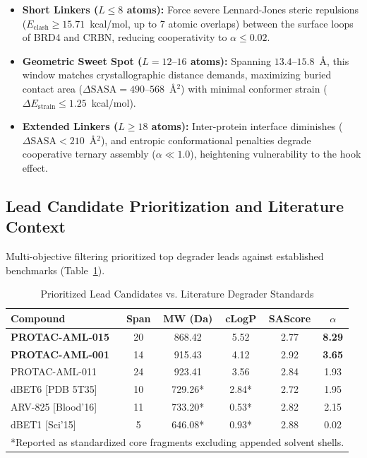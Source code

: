 \documentclass[conference]{IEEEtran}
\begin{document}
\begin{itemize}
    \item \textbf{Short Linkers ($L \le 8$ atoms):} Force severe Lennard-Jones steric repulsions ($E_{\text{clash}} \ge 15.71$~kcal/mol, up to 7 atomic overlaps) between the surface loops of BRD4 and CRBN, reducing cooperativity to $\alpha \le 0.02$.
    \item \textbf{Geometric Sweet Spot ($L = 12\text{--}16$ atoms):} Spanning $13.4\text{--}15.8$~\AA, this window matches crystallographic distance demands, maximizing buried contact area ($\Delta\text{SASA} = 490\text{--}568$~\AA$^2$) with minimal conformer strain ($\Delta E_{\text{strain}} \le 1.25$~kcal/mol).
    \item \textbf{Extended Linkers ($L \ge 18$ atoms):} Inter-protein interface diminishes ($\Delta\text{SASA} < 210$~\AA$^2$), and entropic conformational penalties degrade cooperative ternary assembly ($\alpha \ll 1.0$), heightening vulnerability to the hook effect.
\end{itemize}

\subsection{Lead Candidate Prioritization and Literature Context}
Multi-objective filtering prioritized top degrader leads against established benchmarks (Table~\ref{tab:leads}).

\begin{table}[htbp]
\caption{Prioritized Lead Candidates vs. Literature Degrader Standards}
\begin{center}
\begin{tabular}{lccccc}
\toprule
\textbf{Compound} & \textbf{Span} & \textbf{MW (Da)} & \textbf{cLogP} & \textbf{SAScore} & \textbf{$\alpha$} \\
\midrule
\textbf{PROTAC-AML-015} & 20 & 868.42 & 5.52 & 2.77 & \textbf{8.29} \\
\textbf{PROTAC-AML-001} & 14 & 915.43 & 4.12 & 2.92 & \textbf{3.65} \\
PROTAC-AML-011 & 24 & 923.41 & 3.56 & 2.84 & 1.93 \\
dBET6 [PDB 5T35] & 10 & 729.26*& 2.84*& 2.72 & 1.95 \\
ARV-825 [Blood'16]& 11 & 733.20*& 0.53*& 2.82 & 2.15 \\
dBET1 [Sci'15] & 5  & 646.08*& 0.93*& 2.88 & 0.02 \\
\bottomrule
\multicolumn{6}{l}{*Reported as standardized core fragments excluding appended solvent shells.}
\end{tabular}
\label{tab:leads}
\end{center}
\end{table}
\end{document}
